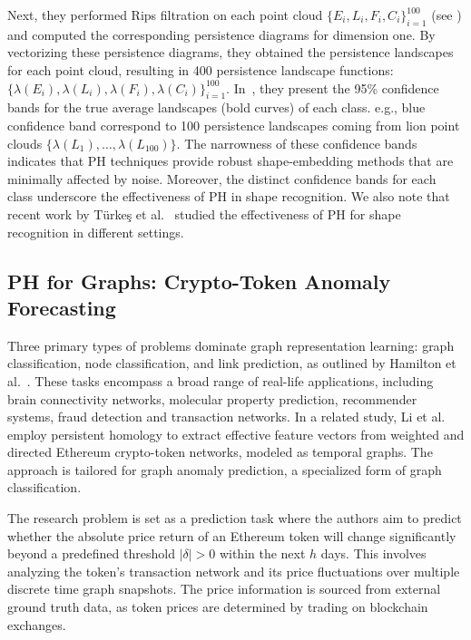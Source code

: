 Next, they performed Rips filtration on each point cloud $\{E_i,L_i,F_i,C_i\}_{i=1}^{100}$ (see ) and computed the corresponding persistence diagrams for dimension one. By vectorizing these persistence diagrams, they obtained the persistence landscapes for each point cloud, resulting in 400 persistence landscape functions: 
$\{\lambda(E_i), \lambda(L_i), \lambda(F_i),  \lambda(C_i)\}_{i=1}^{100}$.
In~, they present the 95\% confidence bands for the true average landscapes (bold curves) of each class. e.g., blue confidence band correspond to 100  persistence landscapes coming from lion point clouds $\{\lambda(L_1), \dots, \lambda(L_{100})\}$. The narrowness of these confidence bands indicates that PH techniques provide robust shape-embedding methods that are minimally affected by noise. Moreover, the distinct confidence bands for each class underscore the effectiveness of PH in shape recognition. We also note that recent work by T\"urke\c{s} et al.~\cite{turkes2022effectiveness} studied the effectiveness of PH for shape recognition in different settings.




\subsection{PH for Graphs: Crypto-Token Anomaly Forecasting} \label{sec:crypto}

Three primary types of problems dominate graph representation learning: graph classification, node classification, and link prediction, as outlined by Hamilton et al.~\cite{hamilton2017representation}. These tasks encompass a broad range of real-life applications, including brain connectivity networks, molecular property prediction, recommender systems, fraud detection and transaction networks. In a related study, Li et al.~\cite{li2020dissecting} employ persistent homology to extract effective feature vectors from weighted and directed Ethereum crypto-token networks, modeled as temporal graphs. The approach is tailored for graph anomaly prediction, a specialized form of graph classification.  
 

 



The research problem is set as a prediction task where the authors aim to predict whether the absolute price return of an Ethereum token will change significantly beyond a predefined threshold $ |\delta| > 0 $ within the next $ h $ days. This involves analyzing the token's transaction network and its price fluctuations over multiple discrete time graph snapshots. The price information is sourced from external ground truth data, as token prices are determined by trading on blockchain exchanges.

